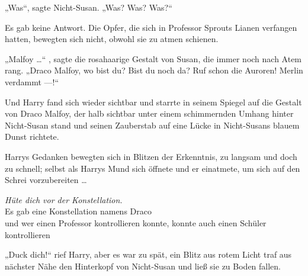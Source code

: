 „Was“, sagte Nicht-Susan.
„Was? Was? Was?“

Es gab keine Antwort. Die Opfer, die sich in Professor Sprouts Lianen verfangen hatten, bewegten sich nicht, obwohl sie zu atmen schienen.

„Malfoy …“ , sagte die rosahaarige Gestalt von Susan, die immer noch nach Atem rang.
„Draco Malfoy, wo bist du? Bist du noch da? Ruf schon die Auroren! Merlin verdammt —!“ 

Und Harry fand sich wieder sichtbar und starrte in seinem Spiegel auf die Gestalt von Draco Malfoy, der halb sichtbar unter einem schimmernden Umhang hinter Nicht-Susan stand und seinen Zauberstab auf eine Lücke in Nicht-Susans blauem Dunst richtete.

Harrys Gedanken bewegten sich in Blitzen der Erkenntnis, zu langsam und doch zu schnell; selbst als Harrys Mund sich öffnete und er einatmete, um sich auf den Schrei vorzubereiten …

\noindent{}\emph{Hüte dich vor der Konstellation.}\\
Es gab eine Konstellation namens Draco\\
und wer einen Professor kontrollieren konnte, konnte auch einen Schüler kontrollieren

„Duck dich!“ rief Harry, aber es war zu spät, ein Blitz aus rotem Licht traf aus nächster Nähe den Hinterkopf von Nicht-Susan und ließ sie zu Boden fallen.

